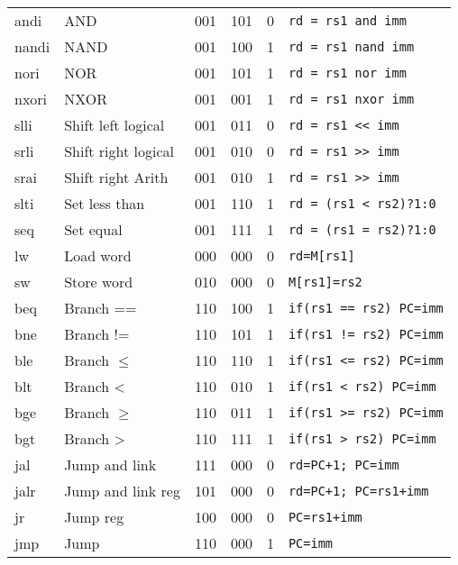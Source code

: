 \documentclass[a4paper]{article}
\begin{document}
\begin{tabular}{|l|l|c|c|c|l|}
        andi  & AND                  & 001    & 101    & 0      & \texttt{rd = rs1 and imm}   \\
        nandi & NAND                 & 001    & 100    & 1      & \texttt{rd = rs1 nand imm}    \\
        nori  & NOR                  & 001    & 101    & 1      & \texttt{rd = rs1 nor imm}     \\
        nxori & NXOR                 & 001    & 001    & 1      & \texttt{rd = rs1 nxor imm}    \\
        slli  & Shift left logical   & 001    & 011    & 0      & \texttt{rd = rs1 << imm}      \\
        srli  & Shift right logical  & 001    & 010    & 0      & \texttt{rd = rs1 >> imm}      \\
        srai  & Shift right Arith    & 001    & 010    & 1      & \texttt{rd = rs1 >> imm}      \\
        slti  & Set less than        & 001    & 110    & 1      & \texttt{rd = (rs1 < rs2)?1:0} \\
        seq   & Set equal            & 001    & 111    & 1      & \texttt{rd = (rs1 = rs2)?1:0} \\
        \hline
        lw    & Load word            & 000    & 000    & 0      & \texttt{rd=M[rs1]}            \\
        sw    & Store word           & 010    & 000    & 0      & \texttt{M[rs1]=rs2}           \\
        \hline
        beq   & Branch ==            & 110    & 100    & 1      & \texttt{if(rs1 == rs2) PC=imm}\\
        bne   & Branch !=            & 110    & 101    & 1      & \texttt{if(rs1 != rs2) PC=imm}\\
        ble   & Branch \(\leqslant\) & 110    & 110    & 1      & \texttt{if(rs1 <= rs2) PC=imm}\\
        blt   & Branch <             & 110    & 010    & 1      & \texttt{if(rs1 < rs2) PC=imm} \\
        bge   & Branch \(\geqslant\) & 110    & 011    & 1      & \texttt{if(rs1 >= rs2) PC=imm}\\
        bgt   & Branch >             & 110    & 111    & 1      & \texttt{if(rs1 > rs2) PC=imm} \\

        \hline
        jal  & Jump and link         & 111    & 000    & 0      &\texttt{rd=PC+1; PC=imm}       \\
        jalr & Jump and link reg     & 101    & 000    & 0      &\texttt{rd=PC+1; PC=rs1+imm}   \\
        jr   & Jump reg              & 100    & 000    & 0      &\texttt{PC=rs1+imm}            \\
        jmp  & Jump                  & 110    & 000    & 1      &\texttt{PC=imm}                \\
        \hline
    \end{tabular}
    
\end{document}
